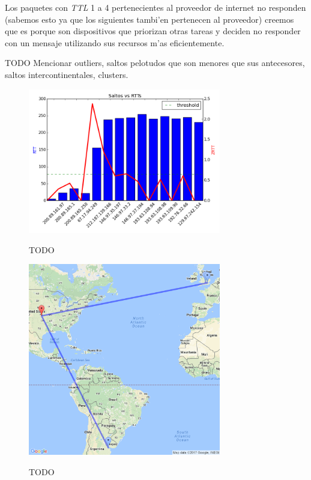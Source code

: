 Los paquetes con \textit{TTL} 1 a 4 pertenecientes al proveedor de internet no responden 
(sabemos esto ya que los siguientes tambi'en pertenecen al proveedor) creemos que es porque son dispositivos que priorizan otras tareas y deciden no
responder con un mensaje utilizando sus recursos m'as eficientemente.

TODO Mencionar outliers, saltos pelotudos que son menores que sus antecesores, saltos intercontinentales, clusters.


\begin{figure}[!h]
\centering
\caption{TODO}
\includegraphics[width=0.75\textwidth]{modules/oxford_rtts}
 \label{fig:oxford_rtts}
\end{figure}


\begin{figure}[!h]
\centering
\caption{TODO}
\includegraphics[width=0.75\textwidth]{modules/oxford_path_1}
 \label{fig:ruta_oxford_1}
\end{figure}


